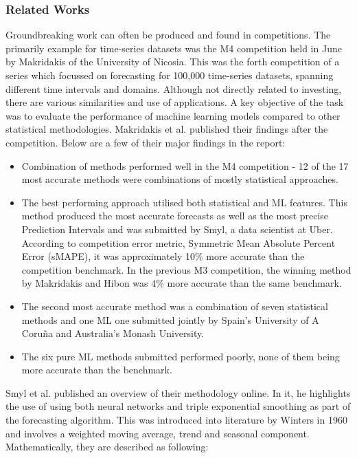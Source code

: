 \documentclass[10pt,onecolumn,letterpaper]{article}
\begin{document}
\subsubsection{Related Works}

Groundbreaking work can often be produced and found in competitions. The primarily example for time-series datasets was the M4 competition held in June by Makridakis of the University of Nicosia. This was the forth competition of a series which focussed on forecasting for 100,000 time-series datasets, spanning different time intervals and domains. Although not directly related to investing, there are various similarities and use of applications. A key objective of the task was to evaluate the performance of machine learning models compared to other statistical methodologies. Makridakis et al.\cite{Makridakis} published their findings after the competition. Below are a few of their major findings in the report:

\begin{itemize}
	\item Combination of methods performed well in the M4 competition - 12 of the 17 most accurate methods were combinations of mostly statistical approaches.
	\item The best performing approach utilised both statistical and ML features. This method produced the most accurate forecasts as well as the most precise Prediction Intervals and was submitted by Smyl, a data scientist at Uber. According to competition error metric, Symmetric Mean Absolute Percent Error (sMAPE), it was approximately 10\% more accurate than the competition benchmark. In the previous M3 competition, the winning method by Makridakis and Hibon was 4\% more accurate than the same benchmark.
	\item The second most accurate method was a combination of seven statistical methods and one ML one submitted jointly by Spain’s University of A Coruña and Australia’s Monash University.
	\item The six pure ML methods submitted performed poorly, none of them being more accurate than the benchmark.
\end{itemize}

Smyl et al. published an overview of their methodology online\cite{Smyl}. In it, he highlights the use of using both neural networks and triple exponential smoothing as part of the forecasting algorithm. This was introduced into literature by Winters\cite{Winters} in 1960 and involves a weighted moving average, trend and seasonal component. Mathematically, they are described as following: 
\end{document}
